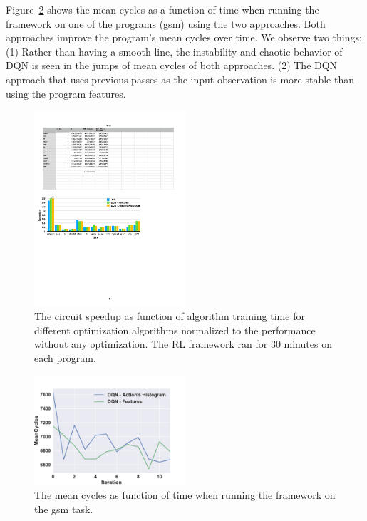 Figure~\ref{fig:gsm_model_action} shows the mean cycles as a function of time when running the framework on one of the programs (gsm) using the two approaches. Both approaches improve the program's mean cycles over time. We observe two things: (1) Rather than having a smooth line, the instability and chaotic behavior of DQN is seen in the jumps of mean cycles of both approaches. (2) The DQN approach that uses previous passes as the input observation is more stable than using the program features.

\begin{figure}[!t]
    \centering        
    \includegraphics[trim={1.1cm 17.7cm 11.5cm 21.5cm},clip,width=0.5\textwidth]{Figures/model-action2.pdf} 
    \caption{The circuit speedup as function of algorithm training time for different optimization algorithms normalized to the performance without any optimization. The RL framework ran for 30 minutes on each program. \vspace*{-0.6cm}}
    \label{fig:model-action}
\end{figure}
\begin{figure}[!t]
    \centering
    \includegraphics[trim={0cm 0cm 0cm 1cm},clip,width=0.5\textwidth]{Figures/gsm_model_action2.pdf}
    \vspace{-0.5cm}
    \caption{The mean cycles as function of time when running the framework on the gsm task. \vspace*{-0.6cm}}
    \label{fig:gsm_model_action}
\end{figure}

